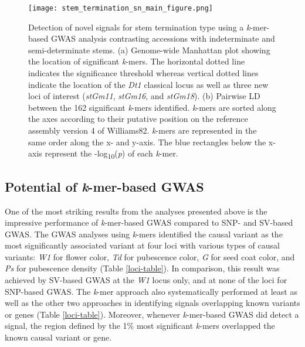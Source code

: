 \documentclass{article}
\begin{document}
\begin{figure}
	\centering
	\texttt{[image: stem\_termination\_sn\_main\_figure.png]}
	\caption[Detection of novel signals for stem termination type
	using a \textit{k}-mer GWAS analysis contrasting accessions with
	indeterminate and semi-determinate stems]{Detection of novel signals for stem termination type
	using a \textit{k}-mer-based GWAS analysis contrasting accessions with
	indeterminate and semi-determinate stems.
	(a) Genome-wide Manhattan plot showing the location of significant \textit{k}-mers.
	The horizontal dotted line indicates the significance threshold
	whereas vertical dotted lines indicate the location of the \textit{Dt1}
	classical locus as well as three new loci of interest (\textit{stGm11},
	\textit{stGm16}, and \textit{stGm18}).
	(b) Pairwise LD between the 162 significant \textit{k}-mers identified.
	\textit{k}-mers are sorted along the axes according to their
	putative position on the reference assembly version 4 of Williams82.
	\textit{k}-mers are
	represented in the same order along the x- and y-axis. The blue
	rectangles below the x-axis represent the
	-log\textsubscript{10}(\textit{p}) of each \textit{k}-mer.}
	\label{stem-termination-main-figure}
\end{figure}


\subsection*{Potential of \emph{k}-mer-based GWAS}

One of the most striking results from the analyses presented above is the
impressive performance of \emph{k}-mer-based GWAS compared to SNP- and SV-based
GWAS. The GWAS analyses using \emph{k}-mers identified the causal variant as
the most significantly associated variant at four loci with various types of
causal variants: \emph{W1} for flower color, \emph{Td} for pubescence color,
\emph{G} for seed coat color, and \emph{Ps} for pubescence density (Table
\ref{loci-table}). In comparison, this result was achieved by SV-based GWAS at
the \textit{W1} locus only, and at none of the loci for SNP-based GWAS.
The \textit{k}-mer approach also systematically performed at least as well as
the other two approaches in identifying signals overlapping known variants or
genes (Table \ref{loci-table}). Moreover, whenever \textit{k}-mer-based GWAS
did detect a signal, the region defined by the 1\% most significant
\textit{k}-mers overlapped the known causal variant or gene. 
\end{document}
